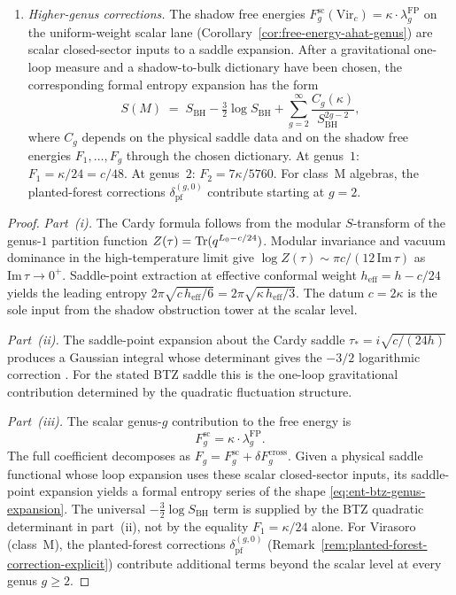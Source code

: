 \begin{theorem}
\begin{enumerate}[label=\textup{(\roman*)}]
\item \emph{Higher-genus corrections.}
The shadow free energies
$F_g^{\mathrm{sc}}(\mathrm{Vir}_c) = \kappa\cdot\lambda_g^{\mathrm{FP}}$
on the uniform-weight scalar lane
\textup{(}Corollary~\textup{\ref{cor:free-energy-ahat-genus}}\textup{)}
are scalar closed-sector inputs to a saddle expansion.  After a
gravitational one-loop measure and a shadow-to-bulk dictionary have
been chosen, the corresponding formal entropy expansion has the form
\begin{equation}\label{eq:ent-btz-genus-expansion}
S(M)
\;=\;
S_{\mathrm{BH}}
- \tfrac{3}{2}\log S_{\mathrm{BH}}
+ \sum_{g=2}^{\infty}
\frac{C_g(\kappa)}{S_{\mathrm{BH}}^{2g-2}},
\end{equation}
where $C_g$ depends on the physical saddle data and on the shadow free
energies $F_1,\ldots,F_g$ through the chosen dictionary.
At genus~$1$: $F_1 = \kappa/24 = c/48$.
At genus~$2$: $F_2 = 7\kappa/5760$.
For class~M algebras, the planted-forest corrections
$\delta_{\mathrm{pf}}^{(g,0)}$ contribute starting at $g = 2$.
\end{enumerate}
\end{theorem}

\begin{proof}
\emph{Part~(i).}
The Cardy formula follows from the modular $S$-transform
of the genus-$1$ partition function
$Z(\tau) = \operatorname{Tr}(q^{L_0 - c/24})$. Modular invariance
and vacuum dominance in the high-temperature limit give
$\log Z(\tau) \sim \pi c/(12\,\mathrm{Im}\,\tau)$ as
$\mathrm{Im}\,\tau \to 0^+$.
Saddle-point extraction at effective conformal weight
$h_{\mathrm{eff}} = h - c/24$ yields
the leading entropy $2\pi\sqrt{c\,h_{\mathrm{eff}}/6}
= 2\pi\sqrt{\kappa\,h_{\mathrm{eff}}/3}$.
The datum $c = 2\kappa$ is the sole input from the
shadow obstruction tower at the scalar level.

\emph{Part~(ii).}
The saddle-point expansion about the Cardy saddle
$\tau_* = i\sqrt{c/(24h)}$
produces a Gaussian integral whose determinant gives the
$-3/2$ logarithmic correction \cite{Carlip98}.
For the stated BTZ saddle this is the one-loop gravitational
contribution determined by the quadratic fluctuation structure.

\emph{Part~(iii).}
The scalar genus-$g$ contribution to the free energy is
\[
F_g^{\mathrm{sc}}
= \kappa\cdot\lambda_g^{\mathrm{FP}} .
\]
The full coefficient decomposes as
$F_g=F_g^{\mathrm{sc}}+\delta F_g^{\mathrm{cross}}$.
Given a physical saddle functional whose loop expansion uses these
scalar closed-sector inputs, its saddle-point expansion yields a
formal entropy series of the shape
\eqref{eq:ent-btz-genus-expansion}.  The universal
$-\tfrac32\log S_{\mathrm{BH}}$ term is supplied by the BTZ
quadratic determinant in part~(ii), not by the equality
$F_1=\kappa/24$ alone.
For Virasoro (class~M), the planted-forest corrections
$\delta_{\mathrm{pf}}^{(g,0)}$
(Remark~\ref{rem:planted-forest-correction-explicit})
contribute additional terms beyond the scalar level
at every genus $g \ge 2$.
\end{proof}

